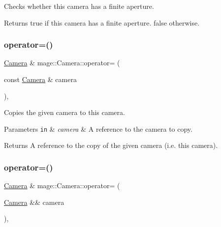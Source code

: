 Checks whether this camera has a finite aperture.

\begin{DoxyReturn}{Returns}
{\ttfamily true} if this camera has a finite aperture. {\ttfamily false} otherwise. 
\end{DoxyReturn}
\hypertarget{classmage_1_1_camera_a785b5e3a62922f7a687ffcaecd0ef89c}{}\label{classmage_1_1_camera_a785b5e3a62922f7a687ffcaecd0ef89c} 
\subsubsection{\texorpdfstring{operator=()}{operator=()}\hspace{0.1cm}{\footnotesize\ttfamily [1/2]}}
{\footnotesize\ttfamily \hyperlink{classmage_1_1_camera}{Camera} \& mage\+::\+Camera\+::operator= (\begin{DoxyParamCaption}\item[{const \hyperlink{classmage_1_1_camera}{Camera} \&}]{camera }\end{DoxyParamCaption})\hspace{0.3cm}{\ttfamily [default]}, {\ttfamily [noexcept]}}

Copies the given camera to this camera.


\begin{DoxyParams}[1]{Parameters}
\mbox{\tt in}  & {\em camera} & A reference to the camera to copy. \\
\hline
\end{DoxyParams}
\begin{DoxyReturn}{Returns}
A reference to the copy of the given camera (i.\+e. this camera). 
\end{DoxyReturn}
\hypertarget{classmage_1_1_camera_ac52101822e004915a96150305564a6bf}{}\label{classmage_1_1_camera_ac52101822e004915a96150305564a6bf} 
\subsubsection{\texorpdfstring{operator=()}{operator=()}\hspace{0.1cm}{\footnotesize\ttfamily [2/2]}}
{\footnotesize\ttfamily \hyperlink{classmage_1_1_camera}{Camera} \& mage\+::\+Camera\+::operator= (\begin{DoxyParamCaption}\item[{\hyperlink{classmage_1_1_camera}{Camera} \&\&}]{camera }\end{DoxyParamCaption})\hspace{0.3cm}{\ttfamily [default]}, {\ttfamily [noexcept]}}

